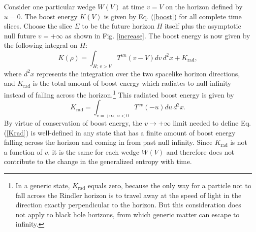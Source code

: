 \documentclass[12pt]{article}
\begin{document}
Consider one particular wedge $W(V)$ at time $v = V$ on the horizon defined by $u = 0$.  The boost energy $K(V)$ is given by Eq. (\ref{boost}) for all complete time slices.  Choose the slice $\Sigma$ to be the future horizon $H$ itself plus the asymptotic null future $v = +\infty$ as shown in Fig. \ref{increase}.  The boost energy is now given by the following integral on $H$:
\begin{equation}\label{K}
K(\rho) = \int_{H;\,v > V} T^{uu}(v - V) dv\,d^2x + K_\mathrm{rad},
\end{equation}
where $d^2x$ represents the integration over the two spacelike horizon directions, and $K_\mathrm{rad}$ is the total amount of boost energy which radiates to null infinity instead of falling across the horizon.\footnote{In a generic state, $K_\mathrm{rad}$ equals zero, because the only way for a particle not to fall across the Rindler horizon is to travel away at the speed of light in the direction exactly perpendicular to the horizon.  But this consideration does not apply to black hole horizons, from which generic matter can escape to infinity.}  This radiated boost energy is given by
\begin{equation}\label{Krad}
K_\mathrm{rad} = \int_{v = +\infty;\,u < 0} T^{vv} (-u) du\,d^2x.
\end{equation}
By virtue of conservation of boost energy, the $v \to +\infty$ limit needed to define Eq. (\ref{Krad}) is well-defined in any state that has a finite amount of boost energy falling across the horizon and coming in from past null infinity.  Since $K_\mathrm{rad}$ is not a function of $v$, it is the same for each wedge $W(V)$ and therefore does not contribute to the change in the generalized entropy with time.
\end{document}
